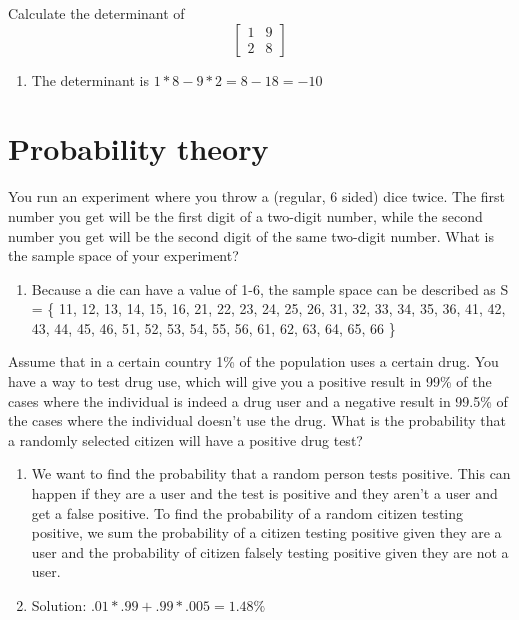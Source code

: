 \documentclass[10pt]{article}
\newenvironment{problem}[2][Problem]{\begin{trivlist}
\item[\hskip \labelsep {\bfseries #1}\hskip \labelsep {\bfseries #2.}]}{\end{trivlist}}
\begin{document}
\begin{problem}{4.4}
Calculate the determinant of
$$\begin{bmatrix}1 & 9 \\ 2 & 8 \end{bmatrix} $$
\begin{enumerate}
    \item The determinant is $1 * 8 - 9 * 2 = 8 - 18 = -10$
\end{enumerate}
\end{problem}

\section{Probability theory}

\begin{problem}{5.1}
You run an experiment where you throw a (regular, 6 sided) dice twice. The first number you get will be the first digit of a two-digit number, while the second number you get will be the second digit of the same two-digit number. What is the sample space of your experiment?

\begin{enumerate}
    \item Because a die can have a value of 1-6, the sample space can be described as 
 S = \{ 11, 12, 13, 14, 15, 16, 21, 22, 23, 24, 25, 26, 31, 32, 33, 34, 35, 36, 41, 42, 43, 44, 45, 46, 51, 52, 53, 54, 55, 56, 61, 62, 63, 64, 65, 66 \}
\end{enumerate}
\end{problem}

\begin{problem}{5.2}
Assume that in a certain country 1\% of the population uses a certain drug. You have a way to test drug use, which will give you a positive result in 99\% of the cases where the individual is indeed a drug user and a negative result in 99.5\% of the cases where the individual doesn't use the drug. What is the probability that a randomly selected citizen will have a positive drug test?

\begin{enumerate}
    \item We want to find the probability that a random person tests positive. This can happen if they are a user and the test is positive and they aren't a user and get a false positive. To find the probability of a random citizen testing positive, we sum the probability of a citizen testing positive given they are a user and the probability of citizen falsely testing positive given they are not a user.
    \item Solution: $.01 * .99 + .99 * .005 = 1.48\%$
\end{enumerate}
\end{problem}
\end{document}
